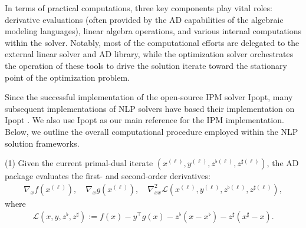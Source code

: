 \documentclass{IEEEtran4PSCC} %
\begin{document}
In terms of practical computations, three key components play
vital roles: derivative evaluations (often provided by the AD
capabilities of the algebraic modeling languages), linear algebra
operations, and various internal computations within the
solver. Notably, most of the computational efforts are delegated to
the external linear solver and AD library, while the optimization solver
orchestrates the operation of these tools to drive the solution
iterate toward the stationary point of the optimization problem.

Since the successful implementation of the open-source IPM solver
Ipopt, many subsequent implementations of NLP solvers
\cite{chiang2014structured,rodriguez2023scalable,shin2021graph} have
based their implementation on Ipopt
\cite{wachter2006implementation}. We also use Ipopt as our main
reference for the IPM implementation. Below, we outline the overall
computational procedure employed within the NLP solution frameworks.

(1) Given the current primal-dual iterate $(x^{(\ell)},y^{(\ell)},
z^{\flat(\ell)},z^{\sharp(\ell)})$, the AD package evaluates the first-
and second-order derivatives:
\begin{align*}
  \nabla_x f(x^{(\ell)}),\quad
  \nabla_x g(x^{(\ell)}),\quad
  \nabla^2_{xx} \mathcal{L}(x^{(\ell)},y^{(\ell)},z^{\flat(\ell)},z^{\sharp(\ell)}),
\end{align*}
where
\begin{align*}
  \mathcal{L}(x,y,z^{\flat},z^{\sharp}):=f(x) - y^\top
  g(x) - z^\flat (x-x^\flat) - z^\sharp (x^\sharp-x).
\end{align*}
\end{document}
